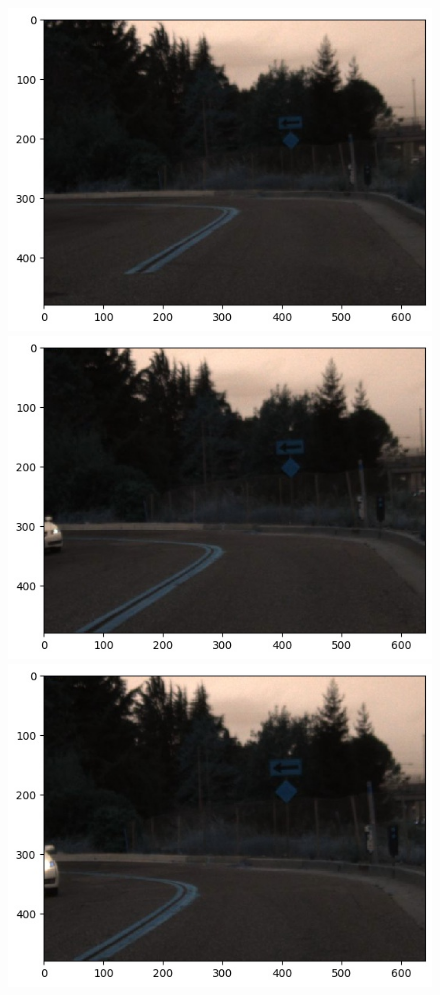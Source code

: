 \documentclass[10pt,twocolumn,letterpaper]{article}
\begin{document}
\begin{figure}[h!]
    \centering
    \includegraphics[scale=0.22]{3rd-real/no-1475522434613719763.jpg}
    \includegraphics[scale=0.22]{3rd-real/no-1475522435113681487.jpg}
    \includegraphics[scale=0.22]{3rd-real/no-1475522435613512147.jpg} \\

\end{figure}
\end{document}
